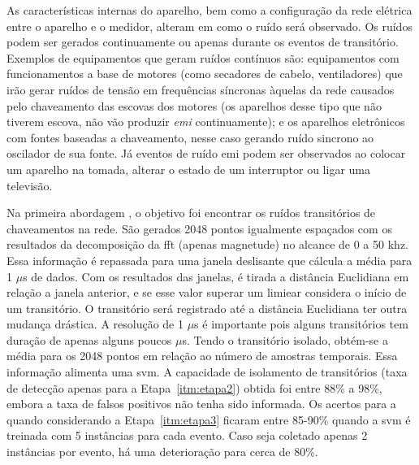 \begin{enumerate}[label=\textbf{2.\arabic*},wide=\parindent]
\begin{itemize}[wide=\parindent]
As características internas do aparelho, bem como a configuração da
rede elétrica entre o aparelho e o medidor, alteram em como o ruído
será observado. Os ruídos podem ser gerados continuamente ou apenas
durante os eventos de transitório. Exemplos de equipamentos que geram
ruídos contínuos são: equipamentos com funcionamentos a base de motores
(como secadores de cabelo, ventiladores) que irão gerar ruídos de
tensão em frequências síncronas àquelas da rede causados pelo
chaveamento das escovas dos motores (os aparelhos desse tipo que não
tiverem escova, não vão produzir \emph{emi} continuamente); e os
aparelhos eletrônicos com fontes baseadas a chaveamento, nesse caso
gerando ruído sincrono ao oscilador de sua fonte. Já eventos de ruído
\gls{emi} podem ser observados ao colocar um aparelho na tomada,
alterar o estado de um interruptor ou ligar uma televisão.

Na primeira abordagem \cite{nilm_patel_2007_29}, o objetivo foi
encontrar os ruídos transitórios de chaveamentos na rede. São gerados
2048 pontos igualmente espaçados com os resultados da decomposição da
\gls{fft} (apenas magnetude) no alcance de 0 a 50 k\gls{hz}. Essa
informação é repassada para uma janela deslisante que cálcula a média
para 1 $\mu$s de dados. Com os resultados das janelas, é tirada a
distância Euclidiana em relação a janela anterior, e se esse valor
superar um limiear considera o início de um transitório. O transitório
será registrado até a distância Euclidiana ter outra mudança drástica.
A resolução de 1 $\mu$s é importante pois alguns transitórios tem
duração de apenas alguns poucos $\mu$s. Tendo o transitório isolado,
obtém-se a média para os 2048 pontos em relação ao número de amostras
temporais. Essa informação alimenta uma \acs{svm}. A capacidade
de isolamento de transitórios (taxa de detecção apenas para a
Etapa~\ref{itm:etapa2}) obtida foi entre 88\% a 98\%, embora a taxa de
falsos positivos não tenha sido informada. Os acertos para a
quando considerando a Etapa~\ref{itm:etapa3} ficaram entre 85-90\%
quando a \acs{svm} é treinada com 5 instâncias para cada evento.
Caso seja coletado apenas 2 instâncias por evento, há uma deterioração
para cerca de 80\%.


\end{itemize}
\end{enumerate}
